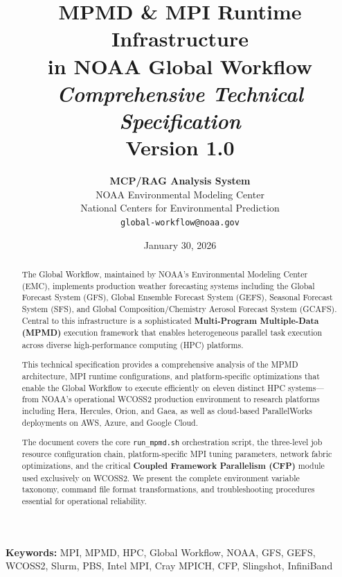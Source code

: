 \documentclass[11pt,a4paper,twoside]{article}
\title{%
    \vspace{1cm}
    {\Huge\bfseries\color{noaablue} MPMD \& MPI Runtime Infrastructure\\[0.3cm]
    in NOAA Global Workflow}\\[0.5cm]
    {\Large\itshape Comprehensive Technical Specification}\\[0.5cm]
    {\large Version 1.0}
}
\author{%
    \textbf{MCP/RAG Analysis System}\\
    NOAA Environmental Modeling Center\\
    National Centers for Environmental Prediction\\[0.5cm]
    \texttt{global-workflow@noaa.gov}
}
\date{January 30, 2026}
\begin{document}

\maketitle
\thispagestyle{empty}

\begin{abstract}
\noindent
The Global Workflow, maintained by NOAA's Environmental Modeling Center (EMC), implements production weather forecasting systems including the Global Forecast System (GFS), Global Ensemble Forecast System (GEFS), Seasonal Forecast System (SFS), and Global Composition/Chemistry Aerosol Forecast System (GCAFS). Central to this infrastructure is a sophisticated \textbf{Multi-Program Multiple-Data (MPMD)} execution framework that enables heterogeneous parallel task execution across diverse high-performance computing (HPC) platforms.

This technical specification provides a comprehensive analysis of the MPMD architecture, MPI runtime configurations, and platform-specific optimizations that enable the Global Workflow to execute efficiently on eleven distinct HPC systems---from NOAA's operational WCOSS2 production environment to research platforms including Hera, Hercules, Orion, and Gaea, as well as cloud-based ParallelWorks deployments on AWS, Azure, and Google Cloud.

The document covers the core \texttt{run\_mpmd.sh} orchestration script, the three-level job resource configuration chain, platform-specific MPI tuning parameters, network fabric optimizations, and the critical \textbf{Coupled Framework Parallelism (CFP)} module used exclusively on WCOSS2. We present the complete environment variable taxonomy, command file format transformations, and troubleshooting procedures essential for operational reliability.
\end{abstract}

\vspace{1cm}

\noindent\textbf{Keywords:} MPI, MPMD, HPC, Global Workflow, NOAA, GFS, GEFS, WCOSS2, Slurm, PBS, Intel MPI, Cray MPICH, CFP, Slingshot, InfiniBand
\end{document}

